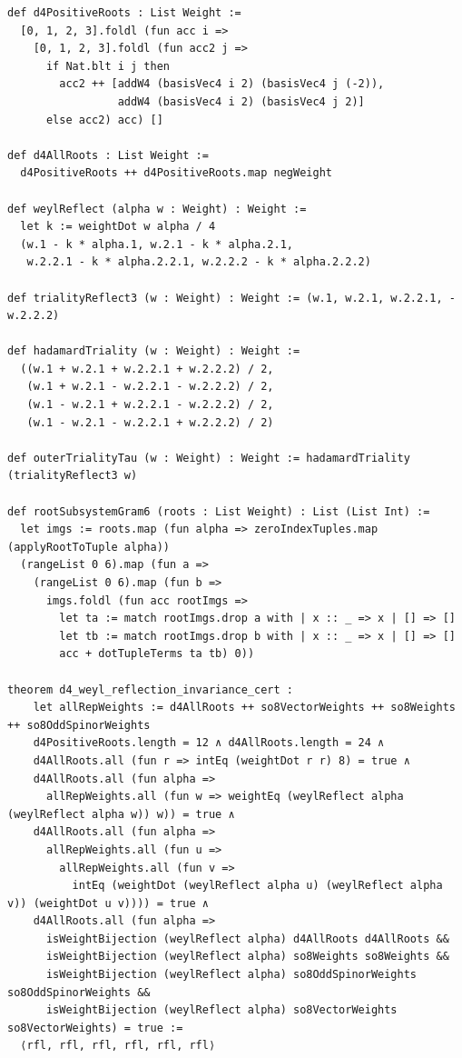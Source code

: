 \documentclass[11pt,a4paper]{article}
\begin{document}
\begin{lstlisting}[caption={Full $24$-root system, order-$3$ outer triality $\tau$, and subalgebra Gram theorems in \texttt{Spin8LieAlgebraTriality.lean}.}]
def d4PositiveRoots : List Weight :=
  [0, 1, 2, 3].foldl (fun acc i =>
    [0, 1, 2, 3].foldl (fun acc2 j =>
      if Nat.blt i j then
        acc2 ++ [addW4 (basisVec4 i 2) (basisVec4 j (-2)),
                 addW4 (basisVec4 i 2) (basisVec4 j 2)]
      else acc2) acc) []

def d4AllRoots : List Weight :=
  d4PositiveRoots ++ d4PositiveRoots.map negWeight

def weylReflect (alpha w : Weight) : Weight :=
  let k := weightDot w alpha / 4
  (w.1 - k * alpha.1, w.2.1 - k * alpha.2.1,
   w.2.2.1 - k * alpha.2.2.1, w.2.2.2 - k * alpha.2.2.2)

def trialityReflect3 (w : Weight) : Weight := (w.1, w.2.1, w.2.2.1, -w.2.2.2)

def hadamardTriality (w : Weight) : Weight :=
  ((w.1 + w.2.1 + w.2.2.1 + w.2.2.2) / 2,
   (w.1 + w.2.1 - w.2.2.1 - w.2.2.2) / 2,
   (w.1 - w.2.1 + w.2.2.1 - w.2.2.2) / 2,
   (w.1 - w.2.1 - w.2.2.1 + w.2.2.2) / 2)

def outerTrialityTau (w : Weight) : Weight := hadamardTriality (trialityReflect3 w)

def rootSubsystemGram6 (roots : List Weight) : List (List Int) :=
  let imgs := roots.map (fun alpha => zeroIndexTuples.map (applyRootToTuple alpha))
  (rangeList 0 6).map (fun a =>
    (rangeList 0 6).map (fun b =>
      imgs.foldl (fun acc rootImgs =>
        let ta := match rootImgs.drop a with | x :: _ => x | [] => []
        let tb := match rootImgs.drop b with | x :: _ => x | [] => []
        acc + dotTupleTerms ta tb) 0))

theorem d4_weyl_reflection_invariance_cert :
    let allRepWeights := d4AllRoots ++ so8VectorWeights ++ so8Weights ++ so8OddSpinorWeights
    d4PositiveRoots.length = 12 ∧ d4AllRoots.length = 24 ∧
    d4AllRoots.all (fun r => intEq (weightDot r r) 8) = true ∧
    d4AllRoots.all (fun alpha =>
      allRepWeights.all (fun w => weightEq (weylReflect alpha (weylReflect alpha w)) w)) = true ∧
    d4AllRoots.all (fun alpha =>
      allRepWeights.all (fun u =>
        allRepWeights.all (fun v =>
          intEq (weightDot (weylReflect alpha u) (weylReflect alpha v)) (weightDot u v)))) = true ∧
    d4AllRoots.all (fun alpha =>
      isWeightBijection (weylReflect alpha) d4AllRoots d4AllRoots &&
      isWeightBijection (weylReflect alpha) so8Weights so8Weights &&
      isWeightBijection (weylReflect alpha) so8OddSpinorWeights so8OddSpinorWeights &&
      isWeightBijection (weylReflect alpha) so8VectorWeights so8VectorWeights) = true :=
  ⟨rfl, rfl, rfl, rfl, rfl, rfl⟩


\end{lstlisting}
\end{document}
